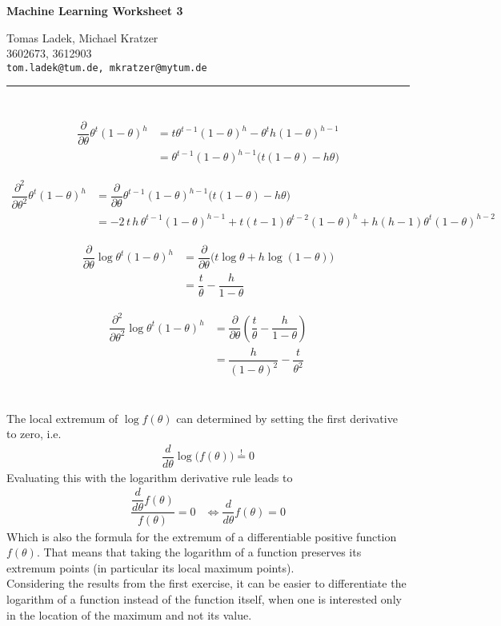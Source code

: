 \documentclass[11pt]{article}
\makeatletter
\newcommand{\exercise}{\section{}}
\newcommand{\hwhead}[4]{
\begin{center}
\sffamily\large\bfseries Machine Learning Worksheet #1
\vspace{2mm}
\normalfont

#2\\
#3\\
\texttt{#4}
\end{center}
\vspace{6mm} \hrule \vspace{4mm}
}
\newcommand{\names}{Tomas Ladek, Michael Kratzer} %
\newcommand{\imats}{3602673, 3612903} %
\newcommand{\emails}{tom.ladek@tum.de, mkratzer@mytum.de} %
\makeatother
\begin{document}
\hwhead{3}{\names}{\imats}{\emails}


\exercise
\begin{align*}
	\dfrac{\partial}{\partial \theta}\theta^t (1-\theta)^h &= t \theta^{t-1} (1-\theta)^h - \theta^t h(1-\theta)^{h-1}\\
	&= \theta^{t-1}(1-\theta)^{h-1}\big(t(1-\theta)-h\theta\big)
\end{align*}

\begin{align*}
	\dfrac{\partial^2}{\partial \theta^2}\theta^t (1-\theta)^h &= \dfrac{\partial}{\partial \theta}\theta^{t-1}(1-\theta)^{h-1}\big(t(1-\theta)-h\theta\big)\\
	 &= -2\,t\,h\,\theta^{t-1}(1-\theta)^{h-1} + t(t-1)\theta^{t-2}(1-\theta)^h + h(h-1)\theta^t(1-\theta)^{h-2}
\end{align*}

\begin{align*}
	\dfrac{\partial}{\partial \theta}\log\theta^t (1-\theta)^h &= \dfrac{\partial}{\partial \theta}\big(t\log\theta + h\log(1-\theta)\big)\\
	&= \dfrac{t}{\theta} - \dfrac{h}{1-\theta}
\end{align*}

\begin{align*}
	\dfrac{\partial^2}{\partial \theta^2}\log\theta^t (1-\theta)^h &= \dfrac{\partial}{\partial \theta}(\dfrac{t}{\theta} - \dfrac{h}{1-\theta})\\
	&= \dfrac{h}{(1-\theta)^2} - \dfrac{t}{\theta^2} 
\end{align*}

\exercise
The local extremum of $\log f(\theta)$ can determined by setting the first derivative to zero, i.e.
\begin{align*}
	\dfrac{d}{d \theta}\log\big(f(\theta)\big) \stackrel{!}{=} 0
\end{align*}
Evaluating this with the logarithm derivative rule leads to 
\begin{align*}
	\dfrac{\dfrac{d}{d\theta}f(\theta)}{f(\theta)} = 0 &\iff \dfrac{d}{d\theta}f(\theta) = 0
\end{align*}
Which is also the formula for the extremum of a differentiable positive function $f(\theta)$. That means that taking the logarithm of a function preserves its extremum points (in particular its local maximum points).\\
Considering the results from the first exercise, it can be easier to differentiate the logarithm of a function instead of the function itself, when one is interested only in the location of the maximum and not its value.
\end{document}
